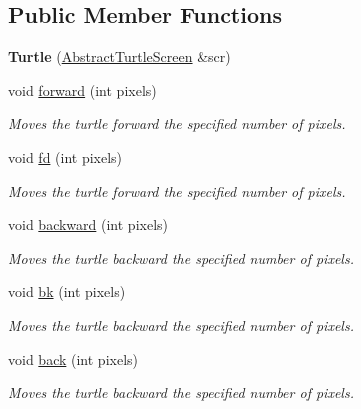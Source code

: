 \subsection*{Public Member Functions}
\begin{DoxyCompactItemize}
\item 
\mbox{\label{classcturtle_1_1Turtle_af819a08c50a1eaceae945e69c4c7968a}} 
{\bfseries Turtle} (\hyperlink{classcturtle_1_1AbstractTurtleScreen}{Abstract\+Turtle\+Screen} \&scr)
\item 
\mbox{\label{classcturtle_1_1Turtle_a472d13726408a2c4f0820a9365d7822b}} 
void \hyperlink{classcturtle_1_1Turtle_a472d13726408a2c4f0820a9365d7822b}{forward} (int pixels)
\begin{DoxyCompactList}\small\item\em Moves the turtle forward the specified number of pixels. \end{DoxyCompactList}\item 
void \hyperlink{classcturtle_1_1Turtle_a2a9fa6b316c96af547eb90b44fbacdc0}{fd} (int pixels)
\begin{DoxyCompactList}\small\item\em Moves the turtle forward the specified number of pixels. \end{DoxyCompactList}\item 
\mbox{\label{classcturtle_1_1Turtle_a2fd24ae80f39ed0598e1d3b2458b6b7b}} 
void \hyperlink{classcturtle_1_1Turtle_a2fd24ae80f39ed0598e1d3b2458b6b7b}{backward} (int pixels)
\begin{DoxyCompactList}\small\item\em Moves the turtle backward the specified number of pixels. \end{DoxyCompactList}\item 
void \hyperlink{classcturtle_1_1Turtle_a3f1ce4b0c550d890f8bfc7e6a02ea1ef}{bk} (int pixels)
\begin{DoxyCompactList}\small\item\em Moves the turtle backward the specified number of pixels. \end{DoxyCompactList}\item 
void \hyperlink{classcturtle_1_1Turtle_a3df431a36f6b1efa56c6b885ae22fde9}{back} (int pixels)
\begin{DoxyCompactList}\small\item\em Moves the turtle backward the specified number of pixels. \end{DoxyCompactList}\item 

\end{DoxyCompactItemize}
